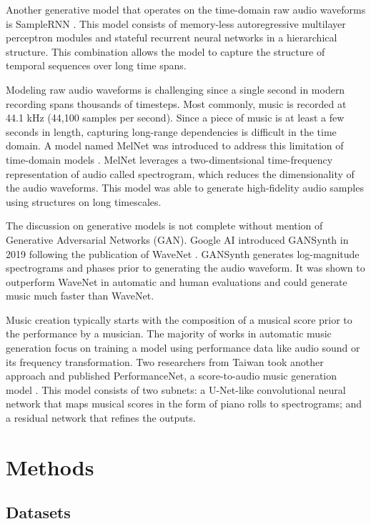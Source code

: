 \documentclass[sigconf,authorversion]{acmart}
\begin{document}
Another generative model that operates on the time-domain raw audio waveforms is 
SampleRNN \cite{mehri_samplernn_2017}. This model consists of memory-less autoregressive 
multilayer perceptron modules and stateful recurrent neural networks in a hierarchical 
structure. This combination allows the model to capture the structure of temporal 
sequences over long time spans.

Modeling raw audio waveforms is challenging since a single second in
modern recording spans thousands of timesteps. Most commonly, music is
recorded at 44.1 kHz (44,100 samples per second). Since a piece of music
is at least a few seconds in length, capturing long-range dependencies
is difficult in the time domain. A model named MelNet was introduced to address
this limitation of time-domain models \cite{vasquez_melnet_2019-1}. MelNet 
leverages a two-dimentsional time-frequency representation of audio called 
spectrogram, which reduces the dimensionality of the audio waveforms. This 
model was able to generate high-fidelity audio samples using structures on
long timescales.

The discussion on generative models is not complete without mention of Generative
Adversarial Networks (GAN). Google AI introduced GANSynth in 2019 following the 
publication of WaveNet \cite{engel_gansynth_2019}. GANSynth generates log-magnitude
spectrograms and phases prior to generating the audio waveform. It was shown to 
outperform WaveNet in automatic and human evaluations and could generate music much
faster than WaveNet.

Music creation typically starts with the composition of a musical score prior 
to the performance by a musician. The majority of works in automatic music 
generation focus on training a model using performance data like audio sound or
 its frequency transformation. Two researchers from Taiwan took another
approach and published PerformanceNet, a score-to-audio music generation model
\cite{wang_performancenet_2018}. This model consists of two subnets: a U-Net-like 
convolutional neural network that maps musical scores in the form of piano rolls 
to spectrograms; and a residual network that refines the outputs.

\section{Methods}

\subsection{Datasets}
\end{document}
